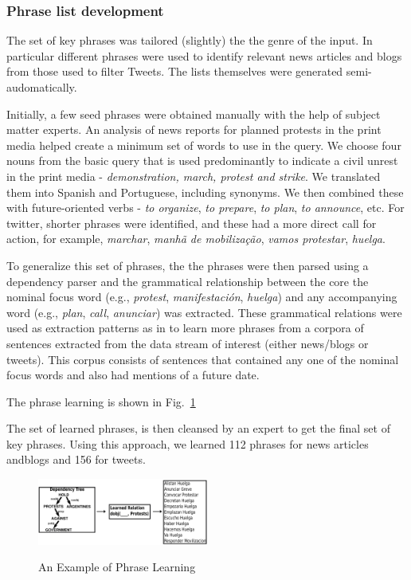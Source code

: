 \subsubsection{Phrase list development}
\label{sec:phraselearning}



The set of key phrases was tailored (slightly) the the genre of the
input. In particular different phrases were used to identify relevant
news articles and blogs from those used to filter Tweets.  The lists
themselves were generated semi-audomatically.

Initially, a few seed phrases were obtained manually
with the help of subject matter experts.
An analysis of news reports for planned protests in the print media helped create a
minimum set of words to use in the query.  We choose four nouns from
the basic query that is used predominantly to indicate a civil unrest
in the print media - {\em demonstration, march, protest and
  strike}. We translated them into Spanish and Portuguese, including
synonyms.  We then combined these with future-oriented verbs - {\em to organize}, {\em to prepare}, {\em to
plan}, {\em to announce}, etc. For twitter, shorter phrases were identified, and these had
a more direct call for action, for example, {\em marchar}, {\em manhã de mobilização}, {\em
  vamos protestar}, {\em huelga}.

To generalize this set of phrases, the the phrases were then parsed
using a dependency parser \cite{freeling} and the grammatical
relationship between the core the nominal focus word (e.g., {\em
  protest}, {\em manifestación}, {\em huelga}) and any accompanying
word (e.g., {\em plan}, {\em call}, {\em anunciar}) was
extracted. These grammatical relations were used as extraction
patterns as in \cite{riloff2003learning} to learn more phrases from a
corpora of sentences extracted from the data stream of interest
(either news/blogs or tweets). This corpus consists of sentences that
contained any one of the nominal focus words and also had mentions of a
future date.

The phrase learning is shown in Fig.~\ref{fig:phraselearning}

The set of learned phrases, is then cleansed by an expert to get the final set of key phrases.
Using this approach, we learned 112 phrases for news articles andblogs and 156 for tweets.

\begin{figure}
\caption{An Example of Phrase Learning}
\includegraphics[width=0.5\textwidth]{figures/phraseLearning}
\label{fig:phraselearning}
\end{figure}


